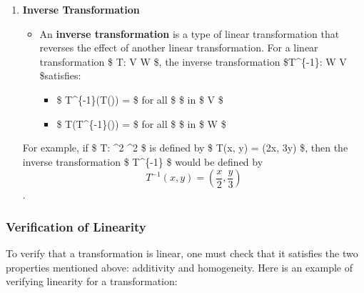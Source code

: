 \documentclass[11pt]{article}
\providecommand{\tightlist}{%
      \setlength{\itemsep}{0pt}\setlength{\parskip}{0pt}}
\begin{document}
\begin{enumerate}
  \begin{itemize}
  \tightlist
  \item
    These transformations scale vectors by a factor. For example,
    scaling a vector in \(\mathbb{R}^2\) by a factor \(k\).
  \end{itemize}

  \textbf{Example}: \(T: \mathbb{R}^2 \to \mathbb{R}^2\) defined by
  \[T\left(\begin{pmatrix} x \\ y \end{pmatrix}\right) = \begin{pmatrix} kx \\ ky \end{pmatrix}\].
\item
  \textbf{Inverse Transformation}

  \begin{itemize}
  \tightlist
  \item
    An \textbf{inverse transformation} is a type of linear
    transformation that reverses the effect of another linear
    transformation. For a linear transformation \$ T: V \to W \$, the
    inverse transformation \$T\^{}\{-1\}: W \to V \$satisfies:

    \begin{itemize}
    \tightlist
    \item
      \$ T\^{}\{-1\}(T()) =  \$ for all \$  \$ in
      \$ V \$
    \item
      \$ T(T\^{}\{-1\}()) =  \$ for all \$  \$ in
      \$ W \$
    \end{itemize}
  \end{itemize}

  For example, if \$ T: \^{}2 \to {}\^{}2 \$ is
  defined by \$ T(x, y) = (2x, 3y) \$, then the inverse transformation
  \$ T\^{}\{-1\} \$ would be defined by
  \[ T^{-1}(x, y) = \left(\frac{x}{2}, \frac{y}{3}\right) \].
\end{enumerate}

\hypertarget{verification-of-linearity}{%
\subsubsection{Verification of
Linearity}\label{verification-of-linearity}}

To verify that a transformation is linear, one must check that it
satisfies the two properties mentioned above: additivity and
homogeneity. Here is an example of verifying linearity for a
transformation:
\end{document}

